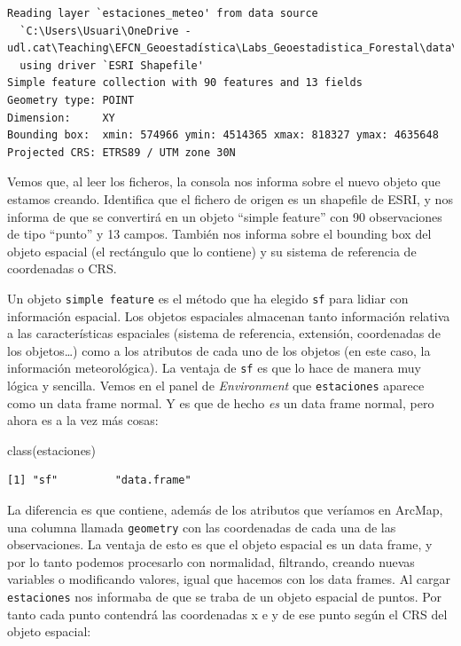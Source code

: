 \documentclass[
  letterpaper,
  DIV=11,
  numbers=noendperiod]{scrreprt}
\newenvironment{Shaded}{\begin{snugshade}}{\end{snugshade}}
\newcommand{\FunctionTok}[1]{\textcolor[rgb]{0.28,0.35,0.67}{#1}}
\newcommand{\NormalTok}[1]{\textcolor[rgb]{0.00,0.23,0.31}{#1}}
\begin{document}
\begin{verbatim}
Reading layer `estaciones_meteo' from data source 
  `C:\Users\Usuari\OneDrive - udl.cat\Teaching\EFCN_Geoestadística\Labs_Geoestadistica_Forestal\data\meteo\meteo_espacial\estaciones_meteo.shp' 
  using driver `ESRI Shapefile'
Simple feature collection with 90 features and 13 fields
Geometry type: POINT
Dimension:     XY
Bounding box:  xmin: 574966 ymin: 4514365 xmax: 818327 ymax: 4635648
Projected CRS: ETRS89 / UTM zone 30N
\end{verbatim}

Vemos que, al leer los ficheros, la consola nos informa sobre el nuevo
objeto que estamos creando. Identifica que el fichero de origen es un
shapefile de ESRI, y nos informa de que se convertirá en un objeto
``simple feature'' con 90 observaciones de tipo ``punto'' y 13 campos.
También nos informa sobre el bounding box del objeto espacial (el
rectángulo que lo contiene) y su sistema de referencia de coordenadas o
CRS.

Un objeto \texttt{simple\ feature} es el método que ha elegido
\texttt{sf} para lidiar con información espacial. Los objetos espaciales
almacenan tanto información relativa a las características espaciales
(sistema de referencia, extensión, coordenadas de los objetos\ldots)
como a los atributos de cada uno de los objetos (en este caso, la
información meteorológica). La ventaja de \texttt{sf} es que lo hace de
manera muy lógica y sencilla. Vemos en el panel de \emph{Environment}
que \texttt{estaciones} aparece como un data frame normal. Y es que de
hecho \emph{es} un data frame normal, pero ahora es a la vez más cosas:

\begin{Shaded}
\begin{Highlighting}[]
\FunctionTok{class}\NormalTok{(estaciones)}
\end{Highlighting}
\end{Shaded}

\begin{verbatim}
[1] "sf"         "data.frame"
\end{verbatim}

La diferencia es que contiene, además de los atributos que veríamos en
ArcMap, una columna llamada \texttt{geometry} con las coordenadas de
cada una de las observaciones. La ventaja de esto es que el objeto
espacial es un data frame, y por lo tanto podemos procesarlo con
normalidad, filtrando, creando nuevas variables o modificando valores,
igual que hacemos con los data frames. Al cargar \texttt{estaciones} nos
informaba de que se traba de un objeto espacial de puntos. Por tanto
cada punto contendrá las coordenadas x e y de ese punto según el CRS del
objeto espacial:
\end{document}
